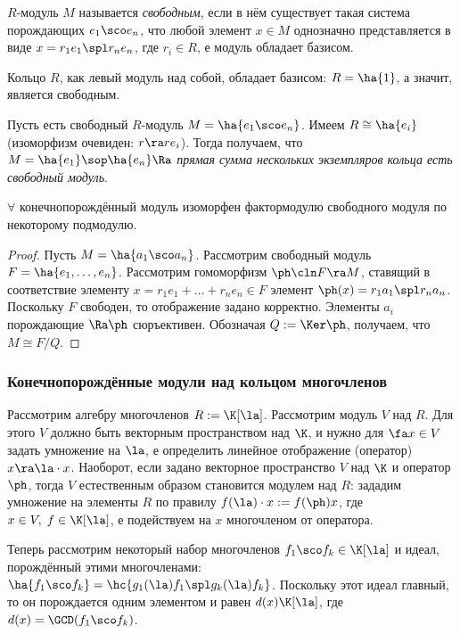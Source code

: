 \documentclass[a4paper]{article}
\begin{document}
\begin{df}
$R$-модуль $M$ называется \emph{свободным}, если в нём существует такая система  порождающих $e_1 \sco
e_n$, что любой элемент $x \in M$ однозначно представляется в виде $x=r_1e_1  \spl  r_n e_n$, где $r_i \in
R$, е модуль обладает базисом.
\end{df}

\begin{ex}
Кольцо $R$, как левый модуль над собой, обладает базисом: $R=\ha{1}$, а значит, является свободным.
\end{ex}

Пусть есть свободный $R$-модуль $M=\ha{e_1 \sco e_n}$. Имеем $R \cong \ha{e_i}$ (изоморфизм  очевиден: $r \ra
r e_i$). Тогда получаем, что $M= \ha{e_1} \sop \ha{e_n} \Ra$ \emph{прямая сумма нескольких экземпляров
кольца есть свободный модуль}.

\begin{theorem}
$\forall$ конечнопорождённый модуль изоморфен фактормодулю свободного модуля по некоторому подмодулю.
\end{theorem}
\begin{proof}
Пусть $M=\ha{a_1 \sco a_n}$. Рассмотрим свободный модуль $F=\ha{e_1,\ldots,e_n}$. Рассмотрим  гомоморфизм
$\ph\cln F\ra M$, ставящий в соответствие элементу $x=r_1e_1+\ldots+r_ne_n \in F$ элемент $\ph(x)=r_1a_1  \spl
r_na_n$. Поскольку $F$ свободен, то отображение задано корректно. Элементы $a_i$ порождающие $\Ra \ph$
сюръективен. Обозначая $Q:=\Ker \ph$, получаем, что $M \cong F/Q$.
\end{proof}

\subsubsection{Конечнопорождённые модули над кольцом многочленов}

Рассмотрим алгебру многочленов $R:=\K[\la]$. Рассмотрим модуль $V$ над $R$. Для этого $V$ должно  быть
векторным пространством над $\K$, и нужно для $\fa x \in V$ задать умножение на $\la$, е определить
линейное отображение (оператор) $x\ra \la \cdot x$. Наоборот, если задано векторное пространство $V$ над
$\K$ и оператор $\ph$, тогда $V$ естественным образом становится модулем над $R$: зададим умножение на
элементы $R$ по правилу $f(\la)\cdot x := f(\ph)x$, где $x \in V, \; f \in \K[\la]$, е
подействуем на $x$ многочленом от оператора.

Теперь рассмотрим некоторый набор многочленов $f_1 \sco f_k \in \K[\la]$ и идеал, порождённый этими
многочленами: $\ha{f_1 \sco f_k}=\hc{g_1(\la)f_1  \spl  g_k(\la)f_k}$. Поскольку этот идеал главный,
то он порождается одним элементом и равен $d(x)\K[\la]$, где $d(x)=\GCD(f_1 \sco f_k)$.
\end{document}
